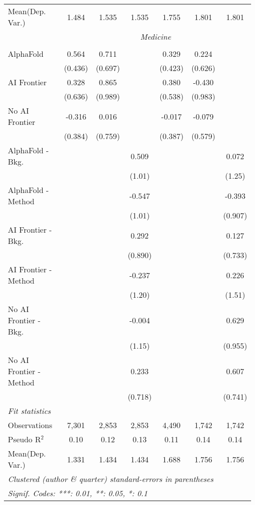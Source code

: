 \begin{tabular}{lcccccc}
Mean(Dep. Var.) & 1.484 & 1.535 & 1.535 & 1.755 & 1.801 & 1.801 \\
 & \multicolumn{6}{c}{\textit{Medicine}} \\ \\
   AlphaFold               & 0.564   & 0.711   &         & 0.329   & 0.224   &   \\   
                           & (0.436) & (0.697) &         & (0.423) & (0.626) &   \\   
   AI Frontier             & 0.328   & 0.865   &         & 0.380   & -0.430  &   \\   
                           & (0.636) & (0.989) &         & (0.538) & (0.983) &   \\   
   No AI Frontier          & -0.316  & 0.016   &         & -0.017  & -0.079  &   \\   
                           & (0.384) & (0.759) &         & (0.387) & (0.579) &   \\   
   AlphaFold - Bkg.        &         &         & 0.509   &         &         & 0.072\\   
                           &         &         & (1.01)  &         &         & (1.25)\\   
   AlphaFold - Method      &         &         & -0.547  &         &         & -0.393\\   
                           &         &         & (1.01)  &         &         & (0.907)\\   
   AI Frontier - Bkg.      &         &         & 0.292   &         &         & 0.127\\   
                           &         &         & (0.890) &         &         & (0.733)\\   
   AI Frontier - Method    &         &         & -0.237  &         &         & 0.226\\   
                           &         &         & (1.20)  &         &         & (1.51)\\   
   No AI Frontier - Bkg.   &         &         & -0.004  &         &         & 0.629\\   
                           &         &         & (1.15)  &         &         & (0.955)\\   
   No AI Frontier - Method &         &         & 0.233   &         &         & 0.607\\   
                           &         &         & (0.718) &         &         & (0.741)\\   
   \midrule
   \emph{Fit statistics}\\
   Observations            & 7,301   & 2,853   & 2,853   & 4,490   & 1,742   & 1,742\\  
   Pseudo R$^2$            & 0.10    & 0.12    & 0.13    & 0.11    & 0.14    & 0.14\\  
Mean(Dep. Var.) & 1.331 & 1.434 & 1.434 & 1.688 & 1.756 & 1.756 \\
   \midrule \midrule
   \multicolumn{7}{l}{\emph{Clustered (author \& quarter) standard-errors in parentheses}}\\
   \multicolumn{7}{l}{\emph{Signif. Codes: ***: 0.01, **: 0.05, *: 0.1}}\\
\end{tabular}
\par\endgroup
